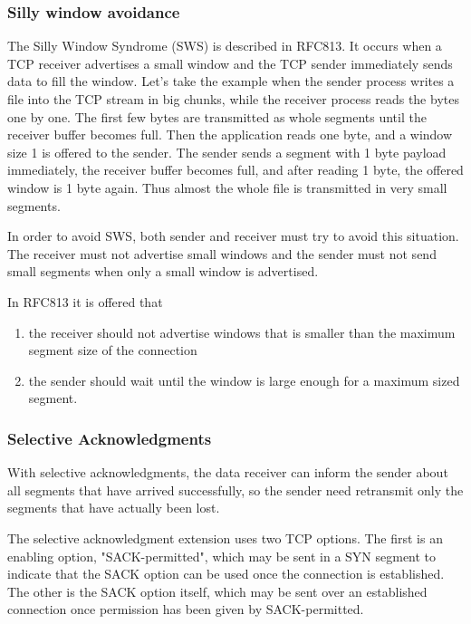 \subsubsection*{Silly window avoidance}

The Silly Window Syndrome (SWS) is described in RFC813. It occurs when
a TCP receiver advertises a small window and the TCP sender immediately
sends data to fill the window. Let's take the example when the sender
process writes a file into the TCP stream in big chunks, while the
receiver process reads the bytes one by one. The first few bytes
are transmitted as whole segments until the receiver buffer
becomes full. Then the application reads one
byte, and a window size 1 is offered to the sender. The sender sends
a segment with 1 byte payload immediately, the receiver buffer becomes
full, and after reading 1 byte, the offered window is 1 byte again.
Thus almost the whole file is transmitted in very small segments.

In order to avoid SWS, both sender and receiver must try to avoid this
situation. The receiver must not advertise small windows and the sender
must not send small segments when only a small window is advertised.

In RFC813 it is offered that
\begin{enumerate}
  \item the receiver should not advertise windows that is smaller than the maximum
        segment size of the connection
  \item the sender should wait until the window is large enough for a maximum sized
        segment. 
\end{enumerate}


\subsubsection*{Selective Acknowledgments}


With selective
acknowledgments, the data receiver can inform the sender about all
segments that have arrived successfully, so the sender need
retransmit only the segments that have actually been lost.

The selective acknowledgment extension uses two TCP options. The
first is an enabling option, "SACK-permitted", which may be sent in a
SYN segment to indicate that the SACK option can be used once the
connection is established.  The other is the SACK option itself,
which may be sent over an established connection once permission has
been given by SACK-permitted.

